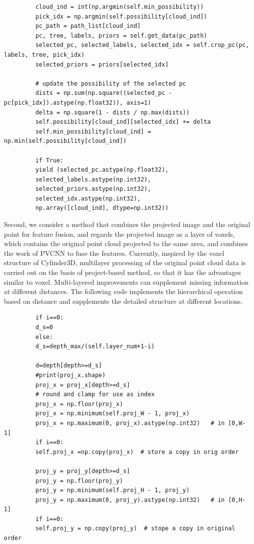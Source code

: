 \documentclass{article}
\begin{document}
\begin{normalsize}
         \begin{lstlisting}
         cloud_ind = int(np.argmin(self.min_possibility))
         pick_idx = np.argmin(self.possibility[cloud_ind])
         pc_path = path_list[cloud_ind]
         pc, tree, labels, priors = self.get_data(pc_path)
         selected_pc, selected_labels, selected_idx = self.crop_pc(pc, labels, tree, pick_idx)
         selected_priors = priors[selected_idx]
         
         # update the possibility of the selected pc
         dists = np.sum(np.square((selected_pc -pc[pick_idx]).astype(np.float32)), axis=1)
         delta = np.square(1 - dists / np.max(dists))
         self.possibility[cloud_ind][selected_idx] += delta
         self.min_possibility[cloud_ind] = np.min(self.possibility[cloud_ind])
         
         if True:
         yield (selected_pc.astype(np.float32),
         selected_labels.astype(np.int32),
         selected_priors.astype(np.int32),
         selected_idx.astype(np.int32),
         np.array([cloud_ind], dtype=np.int32))
         \end{lstlisting}
         
         Second, we consider a method that combines the projected image and the original point for feature fusion, and regards the projected image as a layer of voxels, which contains the original point cloud projected to the same area, and combines the work of PVCNN to fuse the features. Currently, inspired by the voxel structure of Cylinder3D, multilayer processing of the original point cloud data is carried out on the basis of project-based method, so that it has the advantages similar to voxel. Multi-layered improvements can supplement missing information at different distances. The following code implements the hierarchical operation based on distance and supplements the detailed structure at different locations.
         \begin{lstlisting}
         if i==0:
         d_s=0
         else:
         d_s=depth_max/(self.layer_num+1-i)
         
         d=depth[depth>=d_s]
         #print(proj_x.shape)
         proj_x = proj_x[depth>=d_s]
         # round and clamp for use as index
         proj_x = np.floor(proj_x)
         proj_x = np.minimum(self.proj_W - 1, proj_x)
         proj_x = np.maximum(0, proj_x).astype(np.int32)   # in [0,W-1]
         if i==0:
         self.proj_x =np.copy(proj_x)  # store a copy in orig order
         
         proj_y = proj_y[depth>=d_s]
         proj_y = np.floor(proj_y)
         proj_y = np.minimum(self.proj_H - 1, proj_y)
         proj_y = np.maximum(0, proj_y).astype(np.int32)   # in [0,H-1]
         if i==0:
         self.proj_y = np.copy(proj_y)  # stope a copy in original order
         

\end{lstlisting}
\end{normalsize}
\end{document}
